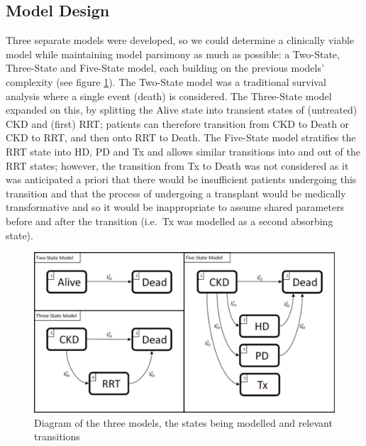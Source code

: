 \documentclass[12pt,PhD,twoside,openright]{muthesis}
\begin{document}
\hypertarget{model-design}{%
\subsection{Model Design}\label{model-design}}

Three separate models were developed, so we could determine a clinically viable model while maintaining model parsimony as much as possible: a Two-State, Three-State and Five-State model, each building on the previous models' complexity (see figure \ref{fig:State-Diagram}). The Two-State model was a traditional survival analysis where a single event (death) is considered. The Three-State model expanded on this, by splitting the Alive state into transient states of (untreated) CKD and (first) RRT; patients can therefore transition from CKD to Death or CKD to RRT, and then onto RRT to Death. The Five-State model stratifies the RRT state into HD, PD and Tx and allows similar transitions into and out of the RRT states; however, the transition from Tx to Death was not considered as it was anticipated a priori that there would be insufficient patients undergoing this transition and that the process of undergoing a transplant would be medically transformative and so it would be inappropriate to assume shared parameters before and after the transition (i.e.~Tx was modelled as a second absorbing state).
\begin{figure}

{\centering \includegraphics[width=0.9\linewidth]{figure/Dev_Paper_State_Diagrams} 

}

\caption{Diagram of the three models, the states being modelled and relevant transitions}\label{fig:State-Diagram}
\end{figure}
\end{document}
